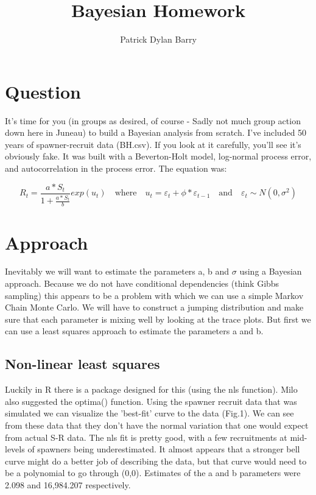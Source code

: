 \documentclass{article}
\begin{document}
\title{Bayesian Homework}
\author{Patrick Dylan Barry}

\maketitle

\section{Question}
It's time for you (in groups as desired, of course - Sadly not much group action down here in Juneau) to build a Bayesian analysis from scratch. I've included 50 years of spawner-recruit data (BH.csv). If you look at it carefully, you'll see it's obviously fake. It was built with a Beverton-Holt model, log-normal process error, and autocorrelation in the process error. The equation was:

\begin{equation}
   R_t = \frac{a*S_t}{1+\frac{a*S_t}{b}}  exp(u_t)
   \quad\text{where}\quad
   u_t = \varepsilon_t + \phi*\varepsilon_{t-1}
   \quad\text{and}\quad
   \varepsilon_t \sim N(0,\sigma^2)
\end{equation}


\section{Approach}
Inevitably we will want to estimate the parameters a, b and $\sigma$ using a Bayesian approach. Because we do not have conditional dependencies (think Gibbs sampling) this appears to be a problem with which we can use a simple Markov Chain Monte Carlo. We will have to construct a jumping distribution and make sure that each parameter is mixing well by looking at the trace plots. But first we can use a least squares approach to estimate the parameters a and b.

\subsection{Non-linear least squares}
Luckily in R there is a package designed for this (using the nls function). Milo also suggested the optima() function. Using the spawner recruit data that was simulated we can visualize the 'best-fit' curve to the data (Fig.1). We can see from these data that they don't have the normal variation that one would expect from actual S-R data. The nls fit is pretty good, with a few recruitments at mid-levels of spawners being underestimated. It almost appears that a stronger bell curve might do a better job of describing the data, but that curve would need to be a polynomial to go through (0,0). Estimates of the a and b parameters were 2.098 and 16,984.207 respectively. 
\end{document}
